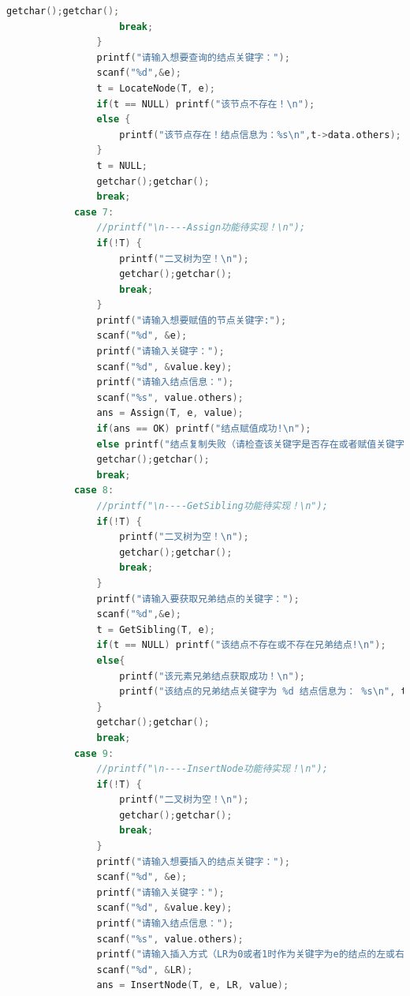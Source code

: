 \documentclass[supercite]{Experimental_Report}
\theoremstyle{definition}
\begin{document}
\begin{lstlisting}[language=c]
                    getchar();getchar();
                    break;
                }
                printf("请输入想要查询的结点关键字：");
                scanf("%d",&e);
                t = LocateNode(T, e);
                if(t == NULL) printf("该节点不存在！\n");
                else {
                    printf("该节点存在！结点信息为：%s\n",t->data.others);
                }
                t = NULL;
                getchar();getchar();
                break;
            case 7:
                //printf("\n----Assign功能待实现！\n");
                if(!T) {
                    printf("二叉树为空！\n");
                    getchar();getchar();
                    break;
                }
                printf("请输入想要赋值的节点关键字:");
                scanf("%d", &e);
                printf("请输入关键字：");
                scanf("%d", &value.key);
                printf("请输入结点信息：");
                scanf("%s", value.others);
                ans = Assign(T, e, value);
                if(ans == OK) printf("结点赋值成功!\n");
                else printf("结点复制失败（请检查该关键字是否存在或者赋值关键字是否重复）!\n");
                getchar();getchar();
                break;
            case 8:
                //printf("\n----GetSibling功能待实现！\n");
                if(!T) {
                    printf("二叉树为空！\n");
                    getchar();getchar();
                    break;
                }
                printf("请输入要获取兄弟结点的关键字：");
                scanf("%d",&e);
                t = GetSibling(T, e);
                if(t == NULL) printf("该结点不存在或不存在兄弟结点!\n");
                else{
                    printf("该元素兄弟结点获取成功！\n");
                    printf("该结点的兄弟结点关键字为 %d 结点信息为： %s\n", t->data.key, t->data.others);
                }
                getchar();getchar();
                break;
            case 9:
                //printf("\n----InsertNode功能待实现！\n");
                if(!T) {
                    printf("二叉树为空！\n");
                    getchar();getchar();
                    break;
                }
                printf("请输入想要插入的结点关键字：");
                scanf("%d", &e);
                printf("请输入关键字：");
                scanf("%d", &value.key);
                printf("请输入结点信息：");
                scanf("%s", value.others);
                printf("请输入插入方式（LR为0或者1时作为关键字为e的结点的左或右孩子结点，LR为-1时，作为根结点插入，原根结点作为c的右子树）：");
                scanf("%d", &LR);
                ans = InsertNode(T, e, LR, value);

\end{lstlisting}
\end{document}
